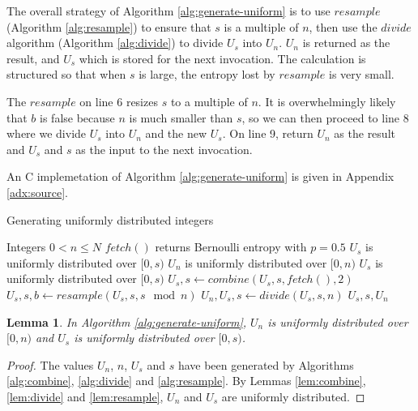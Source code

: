 \documentclass[12pt]{article}
\newtheorem{lemma}{Lemma}
\begin{document}
The overall strategy of Algorithm \ref{alg:generate-uniform} is to use $resample$ (Algorithm \ref{alg:resample}) to ensure that $s$ is a multiple of $n$, then use the $divide$ algorithm (Algorithm \ref{alg:divide}) to divide $U_s$ into $U_n$. $U_n$ is returned as the result, and $U_s$ which is stored for the next invocation. The calculation is structured so that when $s$ is large, the entropy lost by $resample$ is very small.

The $resample$ on line 6 resizes $s$ to a multiple of $n$. It is overwhelmingly likely that $b$ is false because $n$ is much smaller than $s$, so we can then proceed to line 8 where we divide $U_s$ into $U_n$ and the new $U_s$. On line 9, return $U_n$ as the result and $U_s$ and $s$ as the input to the next invocation.

An C implemetation of Algorithm \ref{alg:generate-uniform} is given in Appendix \ref{adx:source}.

\begin{algorithm}
\caption{Generating uniformly distributed integers}
\label{alg:generate-uniform}
\begin{algorithmic}[1]
\Require Integers $0 < n\le N$
\Require $fetch()$ returns Bernoulli entropy with $p=0.5$
\Require $U_s$ is uniformly distributed over $[0,s)$
\Ensure $U_n$ is uniformly distributed over $[0,n)$
\Ensure $U_s$ is uniformly distributed over $[0,s)$
        \State $U_s, s \gets combine(U_s, s, fetch(), 2)$
    \EndWhile
    \State $U_s, s, b \gets resample(U_s, s, s \mod n)$ 
        \State $U_n, U_s, s \gets divide(U_s, s, n)$
        \State \Return $U_s, s, U_n$
    \EndIf
  \EndWhile
\EndProcedure
\end{algorithmic}
\end{algorithm}

\begin{lemma}
    In Algorithm \ref{alg:generate-uniform}, 
$U_n$ is uniformly distributed over $[0,n)$ and 
$U_s$ is uniformly distributed over $[0,s)$.
\end{lemma}

\begin{proof}
The values $U_n$, $n$, $U_s$ and $s$ have been generated by Algorithms \ref{alg:combine}, \ref{alg:divide} and \ref{alg:resample}. By Lemmas \ref{lem:combine}, \ref{lem:divide} and \ref{lem:resample}, $U_n$ and $U_s$ are uniformly distributed.
\end{proof}
\end{document}
